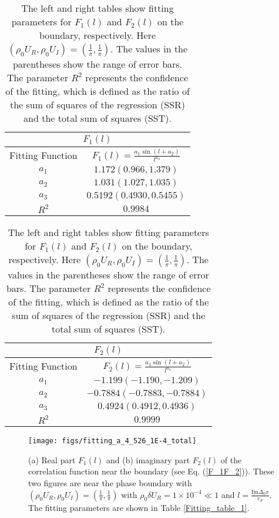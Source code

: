 \documentclass[aps,prl,twocolumn,nofootinbib,superscriptaddress,longbibliography]{revtex4-1}
\begin{document}
\begin{table}
	\begin{tabular}{|c|c|}
		\hline 
		\multicolumn{2}{|c|}{$F_{1}(l)$}\tabularnewline
		\hline
		\hline 
		Fitting Function & $F_1(l)=\frac{a_{1}\sin(l+a_{2})}{l^{a_{3}}}$\tabularnewline
		\hline 
		$a_{1}$ & $1.172(0.966,1.379)$\tabularnewline
		\hline 
		$a_{2}$ & $1.031(1.027,1.035)$\tabularnewline
		\hline 
		$a_{3}$ & $0.5192(0.4930,0.5455)$\tabularnewline
		\hline 
		$R^{2}$ & $0.9984$\tabularnewline
		\hline 
	\end{tabular}%
	\begin{tabular}{|c|c|}
		\hline 
		\multicolumn{2}{|c|}{$F_{2}(l)$}\tabularnewline
		\hline 
		\hline
		Fitting Function & $F_{2}(l)=\frac{a_{1}\sin(l+a_{2})}{l^{a_{3}}}$\tabularnewline
		\hline 
		$a_{1}$ & $-1.199(-1.190,-1.209)$\tabularnewline
		\hline 
		$a_{2}$ & $-0.7884(-0.7883,-0.7884)$\tabularnewline
		\hline 
		$a_{3}$ & $0.4924(0.4912,0.4936)$\tabularnewline
		\hline 
		$R^{2}$ & $0.9999$\tabularnewline
		\hline 
	\end{tabular}
	
	\caption{The left and right tables show fitting parameters for $F_1(l)$ and $F_2(l)$ on the boundary, respectively. Here $(\rho_{0}U_{R},\rho_{0}U_{I})=(\frac{1}{\pi},\frac{1}{\pi})$. The values in the parentheses show the range of error bars. The parameter $R^2$ represents the confidence of the fitting, which is defined as the ratio of the sum of squares of the regression (SSR) and the total sum of squares (SST).}
	
	\label{fitting_table_2}
\end{table}
\begin{figure}[t]
	\centering \texttt{[image: figs/fitting\_a\_4\_526\_1E-4\_total]}
	\caption{(a) Real part $F_1(l)$ and (b) imaginary part $F_2(l)$ of the correlation function near the boundary (see Eq. (\ref{F_1F_2})). These two figures are near the phase boundary with $(\rho_{0}U_{R},\rho_{0}U_{I})=(\frac{1}{\pi},\frac{1}{\pi})$ with $\rho_{0}\delta U_{R}=1\times10^{-4}\ll1$ and $l=\frac{\text{Im}\Delta_0x}{v_F}.$ The fitting parameters are shown in Table \ref{Fitting_table_1}.}
	\label{fig1}
\end{figure}
\end{document}
